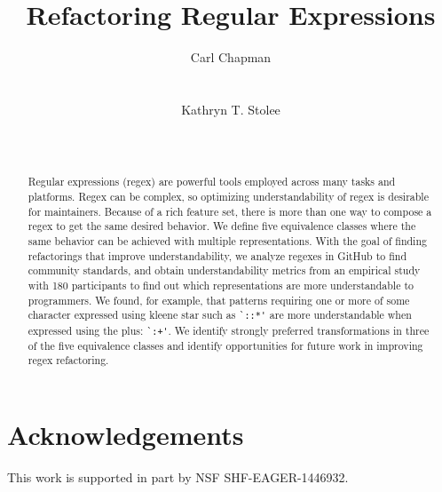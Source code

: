 \documentclass{sig-alternate-05-2015}
\begin{document}
%
\title{Refactoring Regular Expressions}


\author{
\alignauthor
Carl Chapman\\
       \\
       \\
\alignauthor
Kathryn T. Stolee\\
       \\
       \\
\alignauthor
}


\maketitle


\begin{abstract}
Regular expressions (regex) are powerful tools employed across many tasks and platforms.
Regex can be complex, so optimizing understandability of regex is desirable for maintainers.
Because of a rich feature set, there is more than one way to compose a regex to get the same desired behavior.
We define five equivalence classes where the same behavior can be achieved with multiple representations.
With the goal of finding refactorings that improve understandability, we analyze regexes in GitHub to find community standards, and obtain understandability metrics from an empirical study with 180 participants to find out which representations are more  understandable to programmers.
We found, for example, that patterns requiring one or more of some character expressed using kleene star such as \verb!`::*'! are more understandable when expressed using the plus: \verb!`:+'!.  We identify strongly preferred transformations in three of the five equivalence classes and identify opportunities for future work in improving regex refactoring. 
%

\end{abstract}




















\balance

\section*{Acknowledgements}
This work is supported in part by  NSF SHF-EAGER-1446932.




\end{document}
